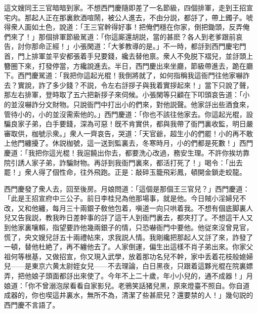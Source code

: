 這文嫂同王三官暗暗到家。不想西門慶隨即差了一名節級，四個排軍，走到王招宣宅内。那起人正在那裏飲酒喧鬧，被公人進去，不由分説，都㧱了，帶上鐲子。唬得衆人面如土色，說道：「王三官幹得好事！把俺們穩在你家，倒把鋤頭，反弄俺們來了！」那個排軍節級駡道：「你這廝還胡説，當的甚麽？各人到老爹跟前哀告，討你那命正經！」小張閑道：「大爹教導的是。」不一時，都㧱到西門慶宅門首，門上排軍並平安都張着手兒要錢，纔去替他禀。衆人不免脱下褶兒，並㧱頭上簪圈下來，打發停當，方纔說進去。半日，西門慶出來坐廳，節級帶進去，跪在廳下。西門慶駡道：「我把你這起光棍！我倒將就了，如何指稱我這衙門往他家嚇詐去？實說，詐了多少錢？不説，令左右㧱拶子與我着實拶起來！」當下只說了聲，那左右排軍，登時取了五六把新拶子來伺候。小張閑等只顧在下叩頭哀告道：「小的並沒嚇詐分文財物。只說衙門中打出小的們來，對他説聲。他家㧱出些酒食來，管待小的，小的並沒需索他的。」西門慶道：「你也不該往他家去。你這起光棍，設騙良家子弟，白手要錢，深為可惡！旣不肯實供，都與我帶了衙門裏收監，明日嚴審取供，枷號示衆。」衆人一齊哀告，哭道：「天官爺，超生小的們罷！小的再不敢上他門纏擾了。休説枷號，這一送到監裏去，冬寒時月，小的們都是死數！」西門慶道：「我把你這光棍！我逭饒出你去，都要洗心改過，務安生理。不許你挨坊靠院引誘人家子弟，詐騙財物。再㧱到我衙門裏來，都活打死了！」喝令：「出去罷！」衆人得了個性命，往外飛跑。正是：敲碎玉籠飛彩鳳，頓開金鎖走蛟龍。

西門慶發了衆人去，回至後房。月娘問道：「這個是那個王三官兒？」西門慶道：「此是王招宣府中三公子。前日李桂兒為他那場事，就是他。今日賊小淫婦兒不改，又和他纏，每月三十兩銀子敎他包着，嗔道一向只哄着我。不想有個底脚裏人兒又告我説，教我昨日差幹事的㧱了這干人到衙門裏去，都夾打了。不想這干人又到他家裏嚷賴，指望要詐他幾兩銀子的情，只恐嚇衙門中要他。他従來沒曾見官，慌了，央文嫂兒㧱五十兩禮帖來，求我説人情。我剛纔把那起人又㧱了來，詐發了一頓，替他杜絶了，再不纏他去了。人家倒運，偏生出這樣不肖子弟出來。你家父祖何等根基，又做招宣，你又現入武學，放着那功名兒不幹，家中丢着花枝般媳婦兒——是東京六黄太尉姪女兒——不去理論，白日黑夜，只跟着這夥光棍在院裏嫖弄，把他娘子頭面都㧱出來使了。今年不上二十歲，年小小兒的，通不成器！」月娘道：「你不曾溺泡尿看看自家影兒。老鴉笑話猪兒黑，原來燈臺不照自。你自道成器的，你也喫這井裏水，無所不為，清潔了些甚麽兒？還要禁的人！」幾句説的西門慶不言語了。

